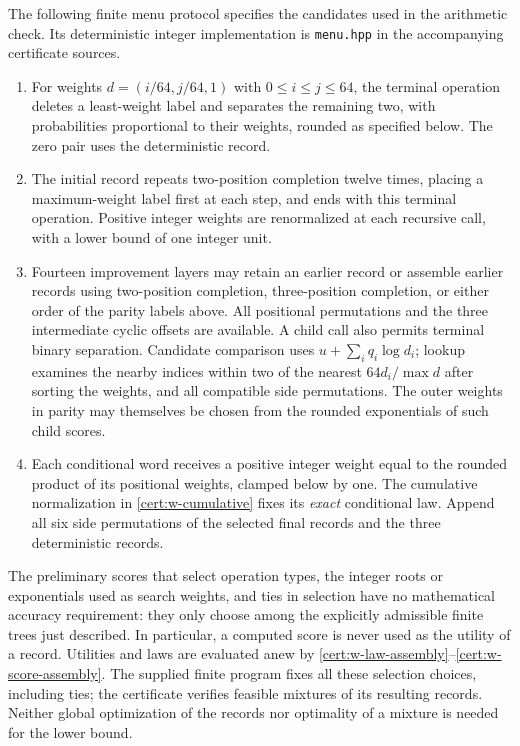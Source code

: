 The following finite menu protocol specifies the candidates used in the
arithmetic check.  Its deterministic integer implementation is
\texttt{menu.hpp} in the accompanying certificate sources.
\begin{enumerate}
\item For weights $d=(i/64,j/64,1)$ with $0\le i\le j\le64$, the
terminal operation deletes a least-weight label and separates the remaining
two, with probabilities proportional to their weights, rounded as specified
below.  The zero pair uses the deterministic record.
\item The initial record repeats two-position completion twelve times,
placing a maximum-weight label first at each step, and ends with this
terminal operation.  Positive integer weights are renormalized at each
recursive call, with a lower bound of one integer unit.
\item Fourteen improvement layers may retain an earlier record or assemble
earlier records using two-position completion, three-position completion,
or either order of the parity labels above.  All positional permutations
and the three intermediate cyclic offsets are available.  A child call
also permits terminal binary separation.  Candidate comparison uses
$u+\sum_iq_i\log d_i$; lookup examines the nearby indices within two of
the nearest $64d_i/\max d$ after sorting the weights, and all compatible
side permutations.  The outer weights in parity may themselves be chosen
from the rounded exponentials of such child scores.
\item Each conditional word receives a positive integer weight equal to
the rounded product of its positional weights, clamped below by one.
The cumulative normalization in \eqref{cert:w-cumulative} fixes its
\emph{exact} conditional law.  Append all six side permutations of the
selected final records and the three deterministic records.
\end{enumerate}
The preliminary scores that select operation types, the integer roots or
exponentials used as search weights, and ties in selection have no
mathematical accuracy requirement: they only choose among the explicitly
admissible finite trees just described.  In particular, a computed score
is never used as the utility of a record.  Utilities and laws are evaluated
anew by \eqref{cert:w-law-assembly}--\eqref{cert:w-score-assembly}.
The supplied finite program fixes all these selection choices, including
ties; the certificate verifies feasible mixtures of its resulting records.
Neither global optimization of the records nor optimality of a mixture
is needed for the lower bound.

